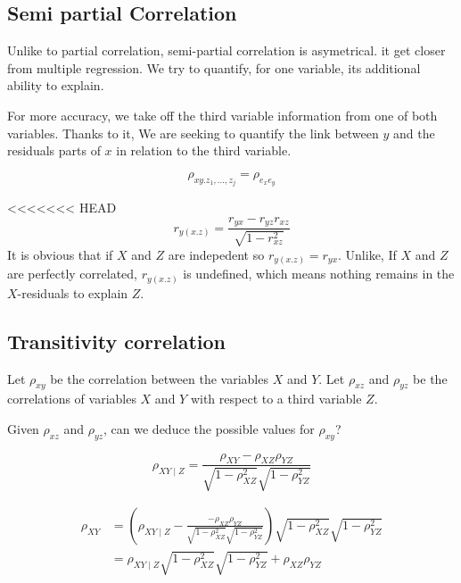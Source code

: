\documentclass[
]{report}
\begin{document}
\hypertarget{semi-partial-correlation}{%
\subsection{Semi partial Correlation}\label{semi-partial-correlation}}

Unlike to partial correlation, semi-partial correlation is asymetrical. it get closer from multiple regression. We try to quantify, for one variable, its additional ability to explain.

For more accuracy, we take off the third variable information from one of both variables. Thanks to it, We are seeking to quantify the link between \(y\) and the residuals parts of \(x\) in relation to the third variable.

\[\rho_{xy.z_1, \ldots, z_j} = \rho_{e_xe_y}\]


\textless\textless\textless\textless\textless\textless\textless{} HEAD
\[r_{y(x.z)}= \frac{r_{yx} - r_{yz}r_{xz}}{\sqrt{1-r^2_{xz}}}\]
It is obvious that if \(X\) and \(Z\) are indepedent so \(r_{y(x.z)}= r_{yx}\). Unlike, If \(X\) and \(Z\) are perfectly correlated, \(r_{y(x.z)}\) is undefined, which means nothing remains in the \(X\)-residuals to explain \(Z\).

\hypertarget{transitivity-correlation}{%
\subsection{Transitivity correlation}\label{transitivity-correlation}}

Let \(\rho_{xy}\) be the correlation between the variables \(X\) and \(Y\). Let \(\rho_{xz}\) and \(\rho_{yz}\) be the correlations of variables \(X\) and \(Y\) with respect to a third variable \(Z\).

Given \(\rho_{xz}\) and \(\rho_{yz}\), can we deduce the possible values for \(\rho_{xy}\)?

\[\rho_{XY \mid Z}={\frac {\rho_{XY}-\rho _{XZ}\rho_{YZ}}{{\sqrt {1-\rho_{XZ}^{2}}}{\sqrt {1-\rho_{YZ}^{2}}}}}\]

\begin{align*}
  \rho_{XY} 
  &=  \left( \rho_{XY \mid Z} - \frac{ - \rho_{XZ} \rho_{YZ}}{\sqrt{1 - \rho_{XZ}^{2}} \sqrt{1 - \rho_{YZ}^{2}}} \right)  \sqrt{1 - \rho_{XZ}^{2}} \sqrt{1 - \rho_{YZ}^{2}}  \\
  &=  \rho_{XY \mid Z} \sqrt{1 - \rho_{XZ}^{2}} \sqrt{1 - \rho_{YZ}^{2}} +  \rho_{XZ} \rho_{YZ}
\end{align*}
\end{document}
